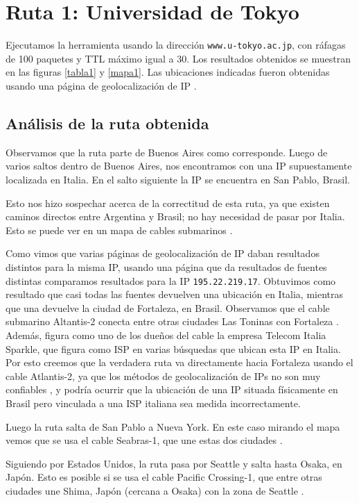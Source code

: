 \section{Ruta 1: Universidad de Tokyo}

Ejecutamos la herramienta usando la dirección \texttt{www.u-tokyo.ac.jp}, con ráfagas de 100 paquetes y TTL máximo igual a 30. Los resultados obtenidos se muestran en las figuras \ref{tabla1} y \ref{mapa1}. Las ubicaciones indicadas fueron obtenidas usando una página de geolocalización de IP \cite{ip2location}.

\subsection{Análisis de la ruta obtenida}
Observamos que la ruta parte de Buenos Aires como corresponde. Luego de varios saltos dentro de Buenos Aires, nos encontramos con una IP supuestamente localizada en Italia. En el salto siguiente la IP se encuentra en San Pablo, Brasil.

Esto nos hizo sospechar acerca de la correctitud de esta ruta, ya que existen caminos directos entre Argentina y Brasil; no hay necesidad de pasar por Italia. Esto se puede ver en un mapa de cables submarinos \cite{cables}.

Como vimos que varias páginas de geolocalización de IP daban resultados distintos para la misma IP, usando una página que da resultados de fuentes distintas \cite{iplocation} comparamos resultados para la IP \texttt{195.22.219.17}. Obtuvimos como resultado que casi todas las fuentes devuelven una ubicación en Italia, mientras que una devuelve la ciudad de Fortaleza, en Brasil. Observamos que el cable submarino Altantis-2 conecta entre otras ciudades Las Toninas con Fortaleza \cite{atlantis2}. Además, figura como uno de los dueños del cable la empresa Telecom Italia Sparkle, que figura como ISP en varias búsquedas que ubican esta IP en Italia. Por esto creemos que la verdadera ruta va directamente hacia Fortaleza usando el cable Atlantis-2, ya que los métodos de geolocalización de IPs no son muy confiables \cite{accuracy}, y podría ocurrir que la ubicación de una IP situada físicamente en Brasil pero vinculada a una ISP italiana sea medida incorrectamente.

Luego la ruta salta de San Pablo a Nueva York. En este caso mirando el mapa \cite{cables} vemos que se usa el cable Seabras-1, que une estas dos ciudades \cite{seabras1}.

Siguiendo por Estados Unidos, la ruta pasa por Seattle y salta hasta Osaka, en Japón. Esto es posible si se usa el cable Pacific Crossing-1, que entre otras ciudades une Shima, Japón (cercana a Osaka) con la zona de Seattle \cite{pc1}.

